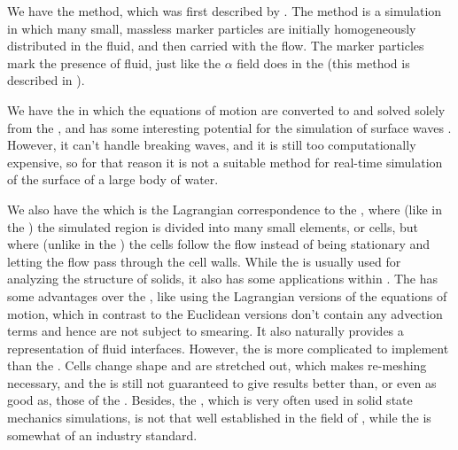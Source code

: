 We have the \MAC method, which was first described by \citet{Harlow1965}. The \MAC method is a \FVM simulation in which many small, massless marker particles are initially homogeneously distributed in the fluid, and then carried with the flow. The marker particles mark the presence of fluid, just like the $\alpha$ field does in the  (this method is described in ).

We have the \BEM in which the equations of motion are converted to  and solved solely from the \boundaries, and has some interesting potential for the simulation of surface waves \citep{Grilli2009}. However, it can't handle breaking waves, and it is still too computationally expensive, so for that reason it is not a suitable method for real-time simulation of the surface of a large body of water.

We also have the \FEM which is the Lagrangian correspondence to the \FVM, where (like in the \FVM) the simulated region is divided into many small elements, or cells, but where (unlike in the \FVM) the cells follow the flow instead of being stationary and letting the flow pass through the cell walls. While the \FEM is usually used for analyzing the structure of solids, it also has some applications within \CFD \citep{Rannacher1999}. The \FEM has some advantages over the \FVM, like using the Lagrangian versions of the equations of motion, which in contrast to the Euclidean versions don't contain any advection terms and hence are not subject to smearing. It also naturally provides a representation of fluid interfaces. However, the \FEM is more complicated to implement than the \FVM. Cells change shape and are stretched out, which makes re-meshing necessary, and the \FEM is still not guaranteed to give results better than, or even as good as, those of the \FVM. Besides, the \FEM, which is very often used in solid state mechanics simulations, is not that well established in the field of \CFD, while the \FVM is somewhat of an industry standard.